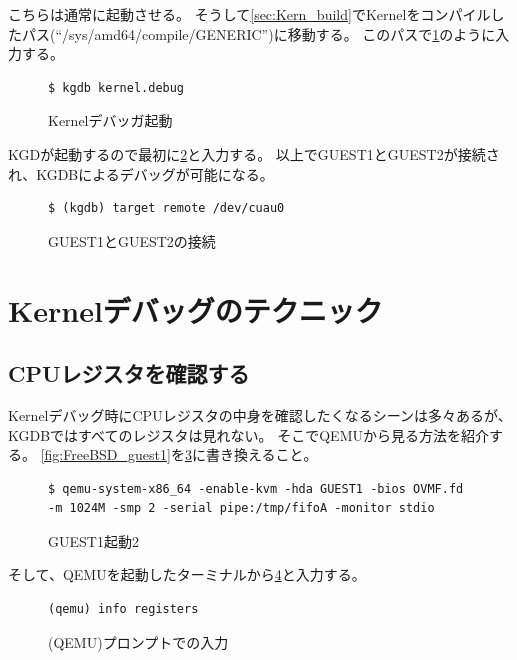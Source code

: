 \documentclass[a4j]{jarticle}
\begin{document}
こちらは通常に起動させる。
そうして\ref{sec:Kern_build}でKernelをコンパイルしたパス(``/sys/amd64/compile/GENERIC'')に移動する。
このパスで\ref{fig:FreeBSD_gdb}のように入力する。
\begin{figure}[htbp]
	\centering
	\begin{lstlisting}[basicstyle=\ttfamily\footnotesize, frame=single, breaklines=true]
$ kgdb kernel.debug
	\end{lstlisting}
	\caption{Kernelデバッガ起動}
	\label{fig:FreeBSD_gdb}
\end{figure}

KGDが起動するので最初に\ref{fig:FreeBSD_gdb_cuau0}と入力する。
以上でGUEST1とGUEST2が接続され、KGDBによるデバッグが可能になる。
\begin{figure}[htbp]
	\centering
	\begin{lstlisting}[basicstyle=\ttfamily\footnotesize, frame=single, breaklines=true]
$ (kgdb) target remote /dev/cuau0
	\end{lstlisting}
	\caption{GUEST1とGUEST2の接続}
	\label{fig:FreeBSD_gdb_cuau0}
\end{figure}

\section{Kernelデバッグのテクニック}
\subsection{CPUレジスタを確認する}
Kernelデバッグ時にCPUレジスタの中身を確認したくなるシーンは多々あるが、
KGDBではすべてのレジスタは見れない。
そこでQEMUから見る方法を紹介する。
\ref{fig:FreeBSD_guest1}を\ref{fig:FreeBSD_guest1_reg}に書き換えること。
\begin{figure}[htbp]
	\centering
		\begin{lstlisting}[basicstyle=\ttfamily\footnotesize, frame=single, breaklines=true]
$ qemu-system-x86_64 -enable-kvm -hda GUEST1 -bios OVMF.fd -m 1024M -smp 2 -serial pipe:/tmp/fifoA -monitor stdio
		\end{lstlisting}
	\caption{GUEST1起動2}
	\label{fig:FreeBSD_guest1_reg}
\end{figure}
そして、QEMUを起動したターミナルから\ref{fig:QEMU_reg_chk}と入力する。
\begin{figure}[htbp]
	\centering
	\begin{lstlisting}[basicstyle=\ttfamily\footnotesize, frame=single, breaklines=true]
(qemu) info registers
	\end{lstlisting}
	\caption{(QEMU)プロンプトでの入力}
	\label{fig:QEMU_reg_chk}
\end{figure}
\end{document}
